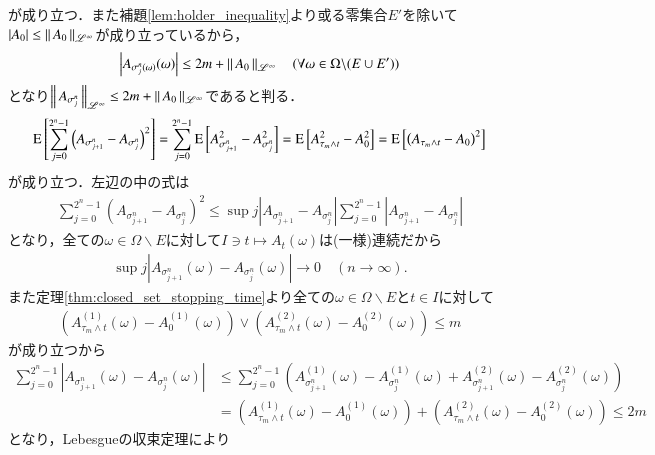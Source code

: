 \begin{prf}
{			が成り立つ．また補題\ref{lem:holder_inequality}より或る零集合$E'$を除いて$|A_0| \leq \left\|\, A_0\, \right\|_{\mathscr{L}^\infty}$が成り立っているから，
			\begin{align}
				\left| A_{\sigma_j^n(\omega)}(\omega) \right| \leq 2m + \left\|\, A_0\, \right\|_{\mathscr{L}^\infty} \quad (\forall \omega \in \Omega \backslash (E \cup E'))
			\end{align}
			となり$\left\|\, A_{\sigma_j^n}\, \right\|_{\mathscr{L}^\infty} \leq 2m + \left\|\, A_0\, \right\|_{\mathscr{L}^\infty}$であると判る．
		}
		\begin{align}
			\operatorname{E} \left[ \sum_{j=0}^{2^n-1} \left( A_{\sigma_{j+1}^n} - A_{\sigma_j^n} \right)^2 \right]
			= \sum_{j=0}^{2^n-1} \operatorname{E} \left[ A_{\sigma_{j+1}^n}^2 - A_{\sigma_j^n}^2 \right]
			= \operatorname{E} \left[ A_{\tau_m \wedge t}^2 - A_{0}^2 \right]
			= \operatorname{E} \left[ \left( A_{\tau_m \wedge t} - A_{0} \right)^2 \right]
		\end{align}
		が成り立つ．左辺の中の式は
		\begin{align}
			\sum_{j=0}^{2^n-1} \left( A_{\sigma_{j+1}^n} - A_{\sigma_j^n} \right)^2
			\leq \sup{j}{\left| A_{\sigma_{j+1}^n} - A_{\sigma_j^n} \right|} \sum_{j=0}^{2^n-1} \left| A_{\sigma_{j+1}^n} - A_{\sigma_j^n} \right|
		\end{align}
		となり，全ての$\omega \in \Omega \backslash E$に対して$I \ni t \longmapsto A_t(\omega)$は(一様)連続だから
		\begin{align}
			\sup{j}{\left| A_{\sigma_{j+1}^n}(\omega) - A_{\sigma_j^n}(\omega) \right|} \longrightarrow 0 \quad (n \longrightarrow \infty).
		\end{align}
		また定理\ref{thm:closed_set_stopping_time}より全ての$\omega \in \Omega \backslash E$と$t \in I$に対して
		\begin{align}
			\left( A^{(1)}_{\tau_m \wedge t}(\omega) - A^{(1)}_0(\omega) \right) \vee \left( A^{(2)}_{\tau_m \wedge t}(\omega) - A^{(2)}_0(\omega) \right) \leq m
		\end{align}
		が成り立つから
		\begin{align}
			\sum_{j=0}^{2^n-1} \left| A_{\sigma_{j+1}^n}(\omega) - A_{\sigma_j^n}(\omega) \right|
			&\leq \sum_{j=0}^{2^n-1} \left( A^{(1)}_{\sigma_{j+1}^n}(\omega) - A^{(1)}_{\sigma_j^n}(\omega) + A^{(2)}_{\sigma_{j+1}^n}(\omega) - A^{(2)}_{\sigma_j^n}(\omega) \right) \\
			&= \left( A^{(1)}_{\tau_m \wedge t}(\omega) - A^{(1)}_0(\omega) \right) + \left( A^{(2)}_{\tau_m \wedge t}(\omega) - A^{(2)}_0(\omega) \right) \leq 2m
		\end{align}
		となり，Lebesgueの収束定理により
		\begin{align}

\end{align}
\end{prf}
